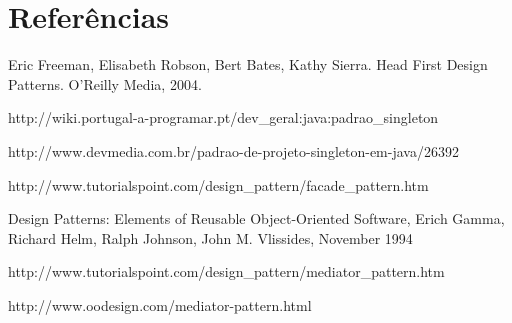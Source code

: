 \section{Referências}

\begin{thebibliography}{99} %

Eric Freeman, Elisabeth Robson, Bert Bates, Kathy Sierra. Head First Design Patterns. O'Reilly Media, 2004.

http://wiki.portugal-a-programar.pt/dev\_geral:java:padrao\_singleton

http://www.devmedia.com.br/padrao-de-projeto-singleton-em-java/26392

http://www.tutorialspoint.com/design\_pattern/facade\_pattern.htm

Design Patterns: Elements of Reusable Object-Oriented Software, Erich Gamma, Richard Helm, Ralph Johnson, John M. Vlissides, November 1994

http://www.tutorialspoint.com/design\_pattern/mediator\_pattern.htm

http://www.oodesign.com/mediator-pattern.html

\end{thebibliography}
